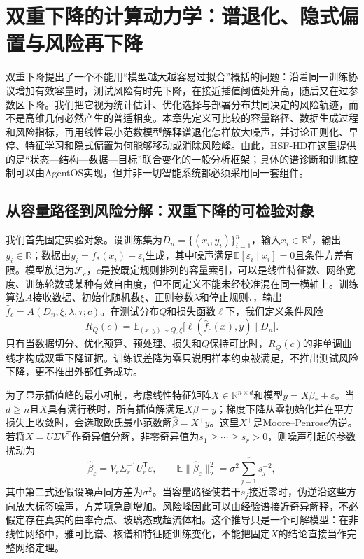 \chapter{双重下降的计算动力学：谱退化、隐式偏置与风险再下降}
\label{chap:double_descent}

双重下降提出了一个不能用“模型越大越容易过拟合”概括的问题：沿着同一训练协议增加有效容量时，测试风险有时先下降，在接近插值阈值处升高，随后又在过参数区下降。我们把它视为统计估计、优化选择与部署分布共同决定的风险轨迹，而不是高维几何必然产生的普适相变。本章先定义可比较的容量路径、数据生成过程和风险指标，再用线性最小范数模型解释谱退化怎样放大噪声，并讨论正则化、早停、特征学习和隐式偏置为何能够移动或消除风险峰。由此，HSF-HD在这里提供的是“状态—结构—数据—目标”联合变化的一般分析框架；具体的谱诊断和训练控制可以由AgentOS实现，但并非一切智能系统都必须采用同一套组件。

\section{从容量路径到风险分解：双重下降的可检验对象}
\label{sec:section_6576}

我们首先固定实验对象。设训练集为$D_n=\{(x_i,y_i)\}_{i=1}^{n}$，输入$x_i\in\mathbb{R}^{d}$，输出$y_i\in\mathbb{R}$；数据由$y_i=f_*(x_i)+\varepsilon_i$生成，其中噪声满足$\mathbb{E}[\varepsilon_i\mid x_i]=0$且条件方差有限。模型族记为$\mathcal{F}_{c}$，$c$是按既定规则排列的容量索引，可以是线性特征数、网络宽度、训练轮数或某种有效自由度，但不同定义不能未经校准混在同一横轴上。训练算法$A$接收数据、初始化随机数$\xi$、正则参数$\lambda$和停止规则$\tau$，输出$\widehat f_c=A(D_n,\xi,\lambda,\tau;c)$。在测试分布$Q$和损失函数$\ell$下，我们定义条件风险
\begin{equation}
  R_Q(c)=\mathbb{E}_{(x,y)\sim Q,\xi}
  \bigl[\ell(\widehat f_c(x),y)\mid D_n\bigr].
\end{equation}
只有当数据切分、优化预算、预处理、损失和$Q$保持可比时，$R_Q(c)$的非单调曲线才构成双重下降证据。训练误差降为零只说明样本约束被满足，不推出测试风险下降，更不推出外部任务成功。

为了显示插值峰的最小机制，考虑线性特征矩阵$X\in\mathbb{R}^{n\times d}$和模型$y=X\beta_*+\varepsilon$。当$d\geq n$且$X$具有满行秩时，所有插值解满足$X\beta=y$；梯度下降从零初始化并在平方损失上收敛时，会选取欧氏最小范数解$\widehat\beta=X^+y$。这里$X^+$是Moore--Penrose伪逆。若将$X=U\Sigma V^{\mathsf T}$作奇异值分解，非零奇异值为$s_1\geq\cdots\geq s_r>0$，则噪声引起的参数扰动为
\begin{equation}
  \widehat\beta_{\varepsilon}=V_r\Sigma_r^{-1}U_r^{\mathsf T}\varepsilon,
  \qquad
  \mathbb{E}\|\widehat\beta_{\varepsilon}\|_2^2
  =\sigma^2\sum_{j=1}^{r}s_j^{-2},
\end{equation}
其中第二式还假设噪声同方差为$\sigma^2$。当容量路径使若干$s_j$接近零时，伪逆沿这些方向放大标签噪声，方差项急剧增加。风险峰因此可以由经验谱接近奇异解释，不必假定存在真实的曲率奇点、玻璃态或超流体相。这个推导只是一个可解模型：在非线性网络中，雅可比谱、核谱和特征随训练变化，不能把固定$X$的结论直接当作完整网络定理。

